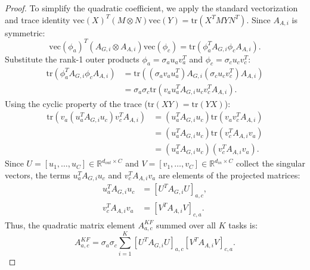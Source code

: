 \documentclass{article}
\theoremstyle{plain}
\theoremstyle{definition}
\theoremstyle{remark}
\begin{document}
\begin{proof}
To simplify the quadratic coefficient, we apply the standard vectorization and trace identity $\text{vec}(X)^T (M \otimes N) \text{vec}(Y) = \text{tr}(X^T M Y N^T)$. Since $A_{A,i}$ is symmetric:
\begin{equation}
    \text{vec}(\phi_a)^T (A_{G,i} \otimes A_{A,i}) \text{vec}(\phi_c) = \text{tr}\left( \phi_a^T A_{G,i} \phi_c A_{A,i} \right).
\end{equation}
Substitute the rank-1 outer products $\phi_a = \sigma_a u_a v_a^T$ and $\phi_c = \sigma_c u_c v_c^T$:
\begin{align}
    \text{tr}\left( \phi_a^T A_{G,i} \phi_c A_{A,i} \right) &= \text{tr}\left( (\sigma_a v_a u_a^T) A_{G,i} (\sigma_c u_c v_c^T) A_{A,i} \right) \nonumber \\
    &= \sigma_a \sigma_c \text{tr}\left( v_a u_a^T A_{G,i} u_c v_c^T A_{A,i} \right).
\end{align}
Using the cyclic property of the trace ($\text{tr}(X Y) = \text{tr}(Y X)$):
\begin{align}
    \text{tr}\left( v_a (u_a^T A_{G,i} u_c) v_c^T A_{A,i} \right) &= (u_a^T A_{G,i} u_c) \text{tr}\left( v_a v_c^T A_{A,i} \right) \nonumber \\
    &= (u_a^T A_{G,i} u_c) \text{tr}\left( v_c^T A_{A,i} v_a \right) \nonumber \\
    &= (u_a^T A_{G,i} u_c) (v_c^T A_{A,i} v_a).
\end{align}
Since $U = [u_1, \dots, u_C] \in \mathbb{R}^{d_{out} \times C}$ and $V = [v_1, \dots, v_C] \in \mathbb{R}^{d_{in} \times C}$ collect the singular vectors, the terms $u_a^T A_{G,i} u_c$ and $v_c^T A_{A,i} v_a$ are elements of the projected matrices:
\begin{align}
    u_a^T A_{G,i} u_c &= [U^T A_{G,i} U]_{a,c}, \\
    v_c^T A_{A,i} v_a &= [V^T A_{A,i} V]_{c,a}.
\end{align}
Thus, the quadratic matrix element $A^{KF}_{a,c}$ summed over all $K$ tasks is:
\begin{equation}
    A^{KF}_{a,c} = \sigma_a \sigma_c \sum_{i=1}^K [U^T A_{G,i} U]_{a,c} [V^T A_{A,i} V]_{c,a}.
\end{equation}


\end{proof}
\end{document}
